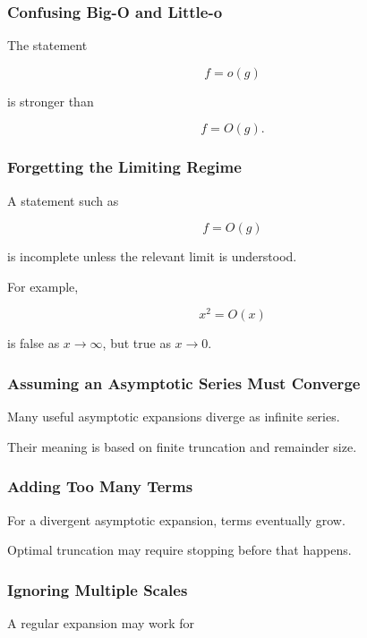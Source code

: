 \subsubsection{Confusing Big-O and Little-o}

The statement

\[
f=o(g)
\]

is stronger than

\[
f=O(g).
\]

\subsubsection{Forgetting the Limiting Regime}

A statement such as

\[
f=O(g)
\]

is incomplete unless the relevant limit is understood.

For example,

\[
x^2=O(x)
\]

is false as \(x\to\infty\), but true as \(x\to0\).

\subsubsection{Assuming an Asymptotic Series Must Converge}

Many useful asymptotic expansions diverge as infinite series.

Their meaning is based on finite truncation and remainder size.

\subsubsection{Adding Too Many Terms}

For a divergent asymptotic expansion, terms eventually grow.

Optimal truncation may require stopping before that happens.

\subsubsection{Ignoring Multiple Scales}

A regular expansion may work for


